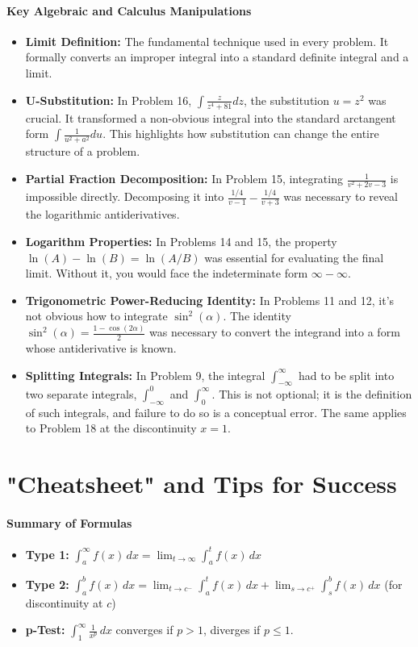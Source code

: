 \documentclass{article}
\begin{document}
\subsection{Key Algebraic and Calculus Manipulations}
\begin{itemize}
    \item \textbf{Limit Definition:} The fundamental technique used in every problem. It formally converts an improper integral into a standard definite integral and a limit.
    \item \textbf{U-Substitution:} In Problem 16, $\int \frac{z}{z^4+81} dz$, the substitution $u=z^2$ was crucial. It transformed a non-obvious integral into the standard arctangent form $\int \frac{1}{u^2+a^2} du$. This highlights how substitution can change the entire structure of a problem.
    \item \textbf{Partial Fraction Decomposition:} In Problem 15, integrating $\frac{1}{v^2+2v-3}$ is impossible directly. Decomposing it into $\frac{1/4}{v-1} - \frac{1/4}{v+3}$ was necessary to reveal the logarithmic antiderivatives.
    \item \textbf{Logarithm Properties:} In Problems 14 and 15, the property $\ln(A) - \ln(B) = \ln(A/B)$ was essential for evaluating the final limit. Without it, you would face the indeterminate form $\infty - \infty$.
    \item \textbf{Trigonometric Power-Reducing Identity:} In Problems 11 and 12, it's not obvious how to integrate $\sin^2(\alpha)$. The identity $\sin^2(\alpha) = \frac{1-\cos(2\alpha)}{2}$ was necessary to convert the integrand into a form whose antiderivative is known.
    \item \textbf{Splitting Integrals:} In Problem 9, the integral $\int_{-\infty}^{\infty}$ had to be split into two separate integrals, $\int_{-\infty}^0$ and $\int_0^\infty$. This is not optional; it is the definition of such integrals, and failure to do so is a conceptual error. The same applies to Problem 18 at the discontinuity $x=1$.
\end{itemize}

\part{"Cheatsheet" and Tips for Success}
\subsection{Summary of Formulas}
\begin{itemize}
    \item \textbf{Type 1:} $\int_{a}^{\infty} f(x) \,dx = \lim_{t \to \infty} \int_{a}^{t} f(x) \,dx$
    \item \textbf{Type 2:} $\int_{a}^{b} f(x) \,dx = \lim_{t \to c^{-}} \int_{a}^{t} f(x) \,dx + \lim_{s \to c^{+}} \int_{s}^{b} f(x) \,dx$ (for discontinuity at $c$)
    \item \textbf{p-Test:} $\int_{1}^{\infty} \frac{1}{x^p} \,dx$ converges if $p > 1$, diverges if $p \le 1$.
\end{itemize}
\end{document}
